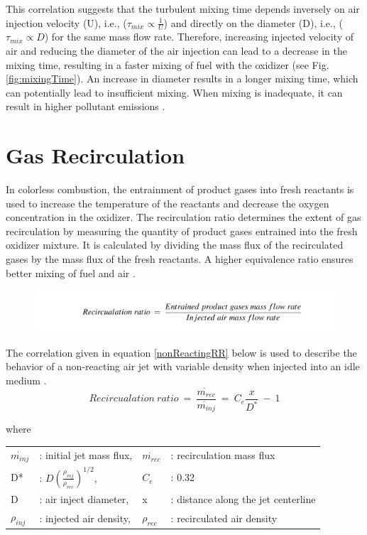 This correlation suggests that the turbulent mixing time depends inversely on air injection velocity (U), i.e., ($\tau_{mix} \propto \frac{1}{U}$) and directly on the diameter (D), i.e., ($\tau_{mix} \propto D$) for the same mass flow rate. Therefore, increasing injected velocity of air and reducing the diameter of the air injection can lead to a decrease in the mixing time, resulting in a faster mixing of fuel with the oxidizer (see Fig. \ref{fig:mixingTime}). An increase in diameter results in a longer mixing time, which can potentially lead to insufficient mixing. When mixing is inadequate, it can result in higher pollutant emissions \cite{VAThesis2011}.

\section{Gas Recirculation}
In colorless combustion, the entrainment of product gases into fresh reactants is used to increase the temperature of the reactants and decrease the oxygen concentration in the oxidizer. The recirculation ratio determines the extent of gas recirculation by measuring the quantity of product gases entrained into the fresh oxidizer mixture. It is calculated by dividing the mass flux of the recirculated gases by the mass flux of the fresh reactants. A higher equivalence ratio ensures better mixing of fuel and air \cite{10.1115/GTINDIA2017-4600}.

\begin{figure}[h!]
	\centering
        \includegraphics[width=1\textwidth]{Chapter3/Images/RR_Formula.png}
\end{figure}
The correlation given in equation \ref{nonReactingRR}  below is used to describe the behavior of a non-reacting air jet with variable density when injected into an idle medium \cite{hussein_capp_george_1994,ricou_spalding_1961}.
\begin{equation}\label{nonReactingRR}
    Recircualation\ ratio\ = \ \frac{\dot{m_{rec}}}{\dot{m_{inj}}} \ = \ C_e \frac{x}{D^*} \ - \ 1
\end{equation}

where
\begin{table}[h!]
    \centering
    \begin{tabular}{l l l l}
      $\dot{m_{inj}}$ & : initial jet mass flux, &  $\dot{m_{rec}}$  &   : recirculation mass flux \\
        D* & : $D(\frac{\rho_{inj}}{\rho_{rec}})^{1/2}$, & $C_e$ & : 0.32 \\
        D & : air inject diameter, & x &  : distance along the jet centerline\\
        $\rho_{inj}$ &  : injected air density, & $\rho_{rec}$ &  : recirculated air density
    \end{tabular}
    \label{nonReactingRR Parameters}
\end{table}

